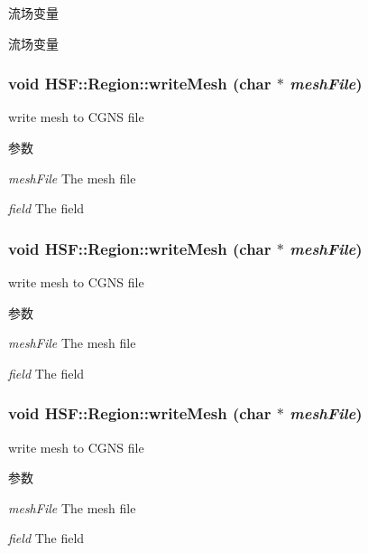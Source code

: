 流场变量

流场变量 \hypertarget{classHSF_1_1Region_a26f134480b539676bf18b26a96434c89}{
\subsubsection[{writeMesh}]{\setlength{\rightskip}{0pt plus 5cm}void HSF::Region::writeMesh (char $\ast$ {\em meshFile})}}
\label{classHSF_1_1Region_a26f134480b539676bf18b26a96434c89}


write mesh to CGNS file 
\begin{DoxyParams}{参数}
\item[{\em meshFile}]The mesh file \item[{\em field}]The field \end{DoxyParams}
\hypertarget{classHSF_1_1Region_a26f134480b539676bf18b26a96434c89}{
\subsubsection[{writeMesh}]{\setlength{\rightskip}{0pt plus 5cm}void HSF::Region::writeMesh (char $\ast$ {\em meshFile})}}
\label{classHSF_1_1Region_a26f134480b539676bf18b26a96434c89}


write mesh to CGNS file 
\begin{DoxyParams}{参数}
\item[{\em meshFile}]The mesh file \item[{\em field}]The field \end{DoxyParams}
\hypertarget{classHSF_1_1Region_a26f134480b539676bf18b26a96434c89}{
\subsubsection[{writeMesh}]{\setlength{\rightskip}{0pt plus 5cm}void HSF::Region::writeMesh (char $\ast$ {\em meshFile})}}
\label{classHSF_1_1Region_a26f134480b539676bf18b26a96434c89}


write mesh to CGNS file 
\begin{DoxyParams}{参数}
\item[{\em meshFile}]The mesh file \item[{\em field}]The field \end{DoxyParams}


